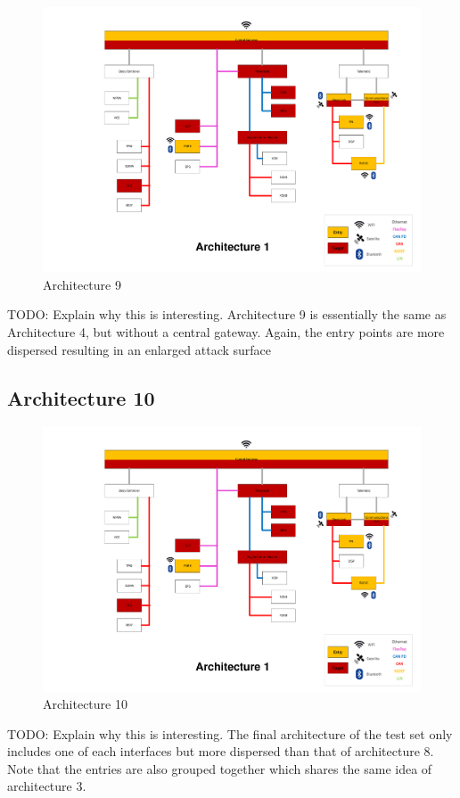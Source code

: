 \begin{figure}[h!]
    \caption{Architecture 9}
    \includegraphics[width=\textwidth, page=9]{../Architectures-survey.pdf}
\end{figure}

TODO: Explain why this is interesting.
Architecture 9 is essentially the same as Architecture 4, but without a central gateway.
Again, the entry points are more dispersed resulting in an enlarged attack surface \par


\subsection*{Architecture 10}
\label{sec:arch10}

\begin{figure}[h!]
    \caption{Architecture 10}
    \includegraphics[width=\textwidth, page=10]{../Architectures-survey.pdf}
\end{figure}

TODO: Explain why this is interesting.
The final architecture of the test set only includes one of each interfaces but more dispersed than that of architecture 8.
Note that the entries are also grouped together which shares the same idea of architecture 3.\\
